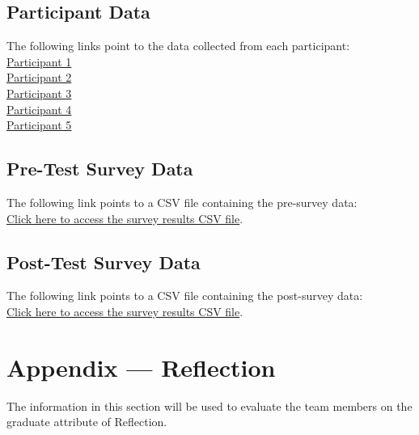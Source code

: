 \documentclass[12pt, titlepage]{article}
\begin{document}
\subsection*{Participant Data}
The following links point to the data collected from each participant:\\

{\noindent
  \href{run:./../Extras/UsabilityTesting/test_data/participant1-data.csv}{Participant
  1} \\[2mm]
  \href{run:./../Extras/UsabilityTesting/test_data/participant2-data.csv}{Participant
  2} \\[2mm]
  \href{run:./../Extras/UsabilityTesting/test_data/participant3-data.csv}{Participant
  3} \\[2mm]
  \href{run:./../Extras/UsabilityTesting/test_data/participant4-data.csv}{Participant
  4} \\[2mm]
  \href{run:./../Extras/UsabilityTesting/test_data/participant5-data.csv}{Participant
  5}
}

\subsection*{Pre-Test Survey Data}
The following link points to a CSV file containing the pre-survey data:\\

\noindent
\href{run:./../Extras/UsabilityTesting/surveys/pre-test-survey-data.csv}{Click
here to access the survey results CSV file}.

\subsection*{Post-Test Survey Data}
The following link points to a CSV file containing the post-survey data:\\

\noindent
\href{run:./../Extras/UsabilityTesting/surveys/post-test-survey-data.csv}{Click
here to access the survey results CSV file}.

\newpage{}
\section*{Appendix --- Reflection}

The information in this section will be used to evaluate the team members on the
graduate attribute of Reflection.


\end{document}
